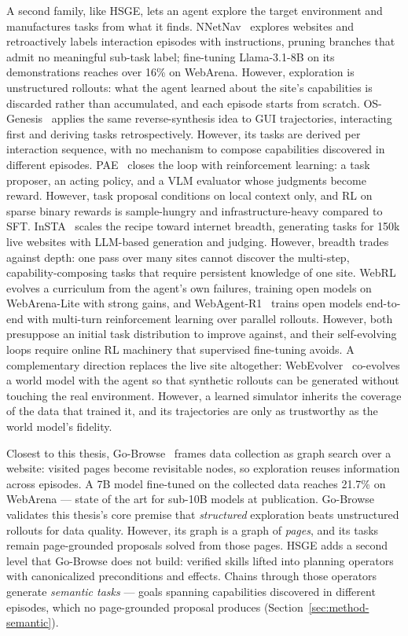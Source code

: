 A second family, like HSGE, lets an agent explore the target environment and
manufactures tasks from what it finds.
NNetNav~\cite{murty2024nnetnav} explores websites and retroactively labels
interaction episodes with instructions, pruning branches that admit no
meaningful sub-task label; fine-tuning Llama-3.1-8B on its demonstrations
reaches over 16\% on WebArena. However, exploration is unstructured rollouts:
what the agent learned about the site's capabilities is discarded rather than
accumulated, and each episode starts from scratch.
OS-Genesis~\cite{sun2024osgenesis} applies the same reverse-synthesis idea to
GUI trajectories, interacting first and deriving tasks retrospectively.
However, its tasks are derived per interaction sequence, with no mechanism to
compose capabilities discovered in different episodes.
PAE~\cite{zhou2024pae} closes the loop with reinforcement learning: a task
proposer, an acting policy, and a VLM evaluator whose judgments become reward.
However, task proposal conditions on local context only, and RL on sparse
binary rewards is sample-hungry and infrastructure-heavy compared to SFT.
InSTA~\cite{trabucco2025insta} scales the recipe toward internet breadth,
generating tasks for 150k live websites with LLM-based generation and
judging. However, breadth trades against depth: one pass over many sites
cannot discover the multi-step, capability-composing tasks that require
persistent knowledge of one site.
WebRL~\cite{qi2025webrl} evolves a curriculum from the agent's own failures,
training open models on WebArena-Lite with strong gains, and
WebAgent-R1~\cite{wei2025webagentr1} trains open models end-to-end with
multi-turn reinforcement learning over parallel rollouts. However, both
presuppose an initial task distribution to improve against, and their
self-evolving loops require online RL machinery that supervised fine-tuning
avoids. A complementary direction replaces the live site altogether:
WebEvolver~\cite{fang2025webevolver} co-evolves a world model with the agent
so that synthetic rollouts can be generated without touching the real
environment. However, a learned simulator inherits the coverage of the data
that trained it, and its trajectories are only as trustworthy as the world
model's fidelity.

Closest to this thesis, Go-Browse~\cite{gandhi2026gobrowse} frames data
collection as graph search over a website: visited pages become revisitable
nodes, so exploration reuses information across episodes. A 7B model
fine-tuned on the collected data reaches 21.7\% on WebArena --- state of the
art for sub-10B models at publication. Go-Browse validates this thesis's core
premise that \emph{structured} exploration beats unstructured rollouts for
data quality. However, its graph is a graph of \emph{pages}, and its tasks
remain page-grounded proposals solved from those pages. HSGE adds a second
level that Go-Browse does not build: verified skills lifted into planning
operators with canonicalized preconditions and effects. Chains through those
operators generate \emph{semantic tasks} --- goals spanning capabilities
discovered in different episodes, which no page-grounded proposal produces
(Section~\ref{sec:method-semantic}).

